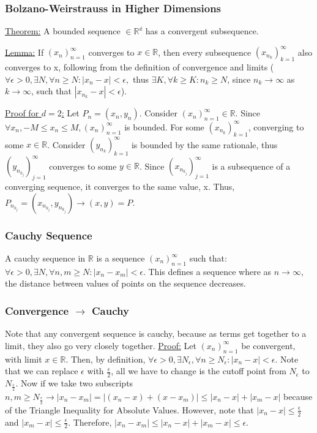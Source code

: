 \subsubsection{Bolzano-Weirstrauss in Higher Dimensions}
\underline{Theorem:} A bounded sequence $\in \mathbb{R^d}$ has a convergent subsequence.

\underline{Lemma:} If $(x_n)_{n=1}^\infty$ converges to $x \in \mathbb{R}$, then every subsequence $(x_{n_k})_{k=1}^\infty$ also converges to x, following from the definition of convergence and limits ($\forall \epsilon > 0, \exists N, \forall n \geq N: |x_n - x| < \epsilon,$ thus $\exists K, \forall k \geq K: n_k \geq N$, since $n_k \to \infty$ as $k \to \infty$, such that $|x_{n_k} - x| < \epsilon$).

\underline{Proof for $d = 2$:} Let $P_n = (x_n, y_n)$. Consider $(x_n)_{n=1}^\infty \in \mathbb{R}$. Since $\forall x_n, -M \leq x_n \leq M, (x_n)_{n=1}^\infty$ is bounded. For some $(x_{n_k})_{k=1}^\infty$, converging to some $x \in \mathbb{R}$. Consider $(y_{n_k})_{k=1}^\infty$ is bounded by the same rationale, thus $(y_{n_{k_j}})^\infty_{j=1}$ converges to some $y \in \mathbb{R}$. Since $(x_{n_{k_j}})_{j=1}^\infty$ is a subsequence of a converging sequence, it converges to the same value, x. Thus, $P_{n_{k_j}} = (x_{n_{k_j}}, y_{n_{k_j}}) \to (x, y) = P$.

\subsubsection{Cauchy Sequence}
A cauchy sequence in $\mathbb{R}$ is a sequence $(x_n)^\infty_{n=1}$ such that: $\forall \epsilon > 0, \exists N, \forall n, m \geq N: |x_n - x_m| < \epsilon$. This defines a sequence where as $n \to \infty$, the distance between values of points on the sequence decreases.

\subsubsection{Convergence $\to$ Cauchy}
Note that any convergent sequence is cauchy, because as terms get together
to a limit, they also go very closely together.
\underline{Proof:} Let $(x_n)_{n = 1}^\infty$ be convergent, with limit $x \in \mathbb{R}$.
Then, by definition, $\forall \epsilon > 0, \exists N_\epsilon, \forall
n \geq N_\epsilon :
|x_n - x| < \epsilon$. Note that we can replace $\epsilon$ with
$\frac{\epsilon}{2}$, all we have to change is the cutoff point from
$N_{\epsilon}$ to $N_{\frac{\epsilon}{2}}$. Now if we take two subscripts
$n, m \geq N_{\frac{\epsilon}{2}} \longrightarrow |x_n - x_m| = |(x_n - x) + (x - x_m)| \leq |x_n - x| + |x_m - x|$ because of the Triangle Inequality for Absolute Values. However, note that $|x_n - x| \leq \frac{\epsilon}{2}$ and $|x_m - x| \leq \frac{\epsilon}{2}$.
Therefore, $|x_n - x_m| \leq |x_n - x| + |x_m - x| \leq \epsilon$.

